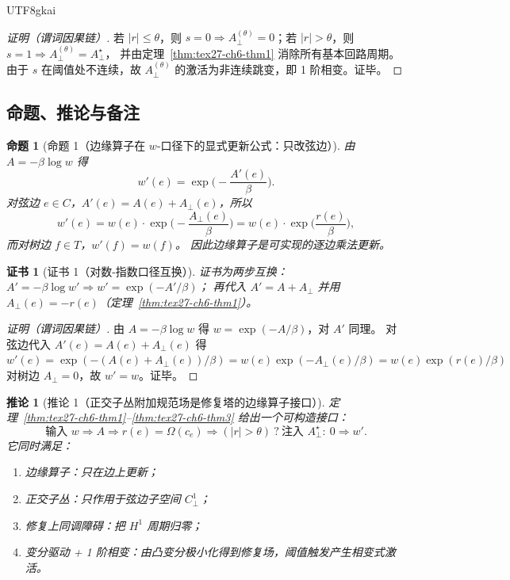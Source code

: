 \documentclass[12pt]{article}
\newtheorem{proposition}{命题}[section]
\newtheorem{corollary}{推论}[section]
\newtheorem{Certificate}{证书}[section]
\begin{document}
\begin{CJK*}{UTF8}{gkai}
\begin{proof}[证明（谓词因果链）]
若 $|r|\le\theta$，则 $s=0\Rightarrow A_{\perp}^{(\theta)}=0$；若 $|r|>\theta$，则 $s=1\Rightarrow A_{\perp}^{(\theta)}
  =A_{\perp}^\star$，
并由定理~\ref{thm:tex27-ch6-thm1} 消除所有基本回路周期。
由于 $s$ 在阈值处不连续，故 $A_{\perp}^{(\theta)}$ 的激活为非连续跳变，即 1 阶相变。证毕。
\end{proof}

\subsection{命题、推论与备注}
\label{subsec:tex27-ch6-others}

\begin{proposition}[命题 1（边缘算子在 $w$-口径下的显式更新公式：只改弦边）]
\label{prop:tex27-ch6-p1}
由 $A=-\beta\log w$ 得
\[
  w'(e)=\exp\!\Big(-\frac{A'(e)}{\beta}\Big).
\]
对弦边 $e\in C$，$A'(e)=A(e)+A_{\perp}(e)$，所以
\[
  w'(e)=w(e)\cdot \exp\!\Big(-\frac{A_{\perp}(e)}{\beta}\Big)
  =w(e)\cdot \exp\!\Big(\frac{r(e)}{\beta}\Big),
\]
而对树边 $f\in T$，$w'(f)=w(f)$。
因此边缘算子是可实现的逐边乘法更新。
\end{proposition}

\begin{Certificate}[证书 1（对数-指数口径互换）]
\label{cert:tex27-ch6-p1}
证书为两步互换：$A'=-\beta\log w'\Rightarrow w'=\exp(-A'/\beta)$；
再代入 $A'=A+A_{\perp}$ 并用 $A_{\perp}(e)=-r(e)$（定理~\ref{thm:tex27-ch6-thm1}）。
\end{Certificate}

\begin{proof}[证明（谓词因果链）]
由 $A=-\beta\log w$ 得 $w=\exp(-A/\beta)$，对 $A'$ 同理。
对弦边代入 $A'(e)=A(e)+A_{\perp}(e)$ 得
$
w'(e)=\exp(-(A(e)+A_{\perp}(e))/\beta)=w(e)\exp(-A_{\perp}(e)/\beta)=w(e)\exp(r(e)/\beta)
$
对树边 $A_{\perp}=0$，故 $w'=w$。证毕。
\end{proof}

\begin{corollary}[推论 1（正交子丛附加规范场是修复塔的边缘算子接口）]
\label{cor:tex27-ch6-c1}
定理~\ref{thm:tex27-ch6-thm1}--\ref{thm:tex27-ch6-thm3} 给出一个可构造接口：
\[
  \text{输入 }w\Rightarrow A\Rightarrow r(e)=\Omega(c_e)\Rightarrow (|r|>\theta)\ ?\ \text{注入 }A_{\perp}^\star:\
    0\Rightarrow w'.
\]
它同时满足：
\begin{enumerate}
  \item 边缘算子：只在边上更新；
  \item 正交子丛：只作用于弦边子空间 $C^1_{\perp}$；
  \item 修复上同调障碍：把 $H^1$ 周期归零；
  \item 变分驱动 + 1 阶相变：由凸变分极小化得到修复场，阈值触发产生相变式激活。
\end{enumerate}
\end{corollary}


\end{CJK*}
\end{document}
